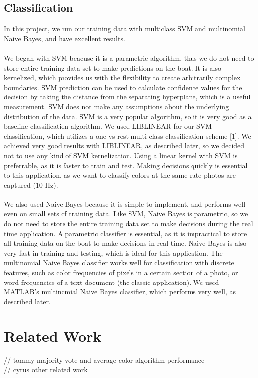 \documentclass{article} %
\begin{document}
\subsection{Classification}
In this project, we run our training data with multiclass SVM and multinomial Naive Bayes, and have excellent results. \\\\
We began with SVM beacuse it is a parametric algorithm, thus we do not need to store entire 
training data set to make predictions on the boat. It is also kernelized, which provides us with the flexibility to
create arbitrarily complex boundaries. SVM prediction can be used to calculate confidence values for the
decision by taking the distance from the separating hyperplane, which is a useful measurement. SVM does not make any
assumptions about the underlying distribution of the data. SVM is a very popular algorithm, so it is very good as a baseline
classification algorithm. We used LIBLINEAR for our SVM classification, which utilizes a one-vs-rest multi-class classification
scheme [1]. We achieved very good results with LIBLINEAR, as described later, so we decided not to use any kind of SVM 
kernelization. Using a linear kernel with SVM is preferrable, as it is faster to train and test. Making decisions quickly
is essential to this application, as we want to classify colors at the same rate photos are captured (10 Hz).\\\\
We also used Naive Bayes because it is simple to implement, and performs well even on small sets of training data. Like
SVM, Naive Bayes is parametric, so we do not need to store the entire training data set to make decisions during the
real time application. A parametric classifier is essential, as it is impractical to store all training data on the boat
to make decisions in real time. Naive Bayes is also very fast in training and testing, which is ideal for this application.
The multinomial Naive Bayes classifier works well for classification with discrete features, such as color frequencies of pixels
in a certain section of a photo, or word frequencies of a text document (the classic application). We used MATLAB's multinomial 
Naive Bayes classifier, which performs very well, as described later.

\section{Related Work}
// tommy majority vote and average color algorithm performance \\
// cyrus other related work
\end{document}
